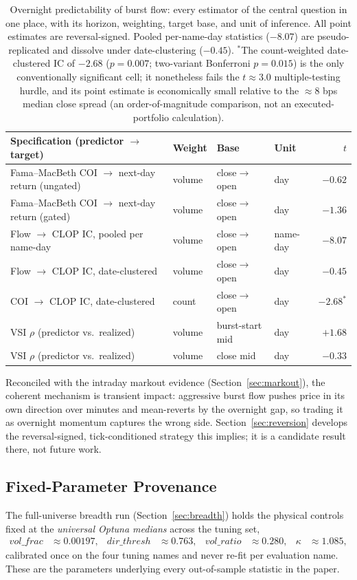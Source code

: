 \documentclass[11pt]{article}
\begin{document}
\begin{table}[htbp]
\centering
\begin{tabular}{llll r}
\toprule
\textbf{Specification (predictor $\to$ target)} & \textbf{Weight} & \textbf{Base} & \textbf{Unit} & \textbf{$t$} \\
\midrule
Fama--MacBeth COI $\to$ next-day return (ungated) & volume & close$\to$open & day & $-0.62$ \\
Fama--MacBeth COI $\to$ next-day return (gated) & volume & close$\to$open & day & $-1.36$ \\
Flow $\to$ CLOP IC, pooled per name-day & volume & close$\to$open & name-day & $-8.07$ \\
Flow $\to$ CLOP IC, date-clustered & volume & close$\to$open & day & $-0.45$ \\
COI $\to$ CLOP IC, date-clustered & count & close$\to$open & day & $-2.68^{*}$ \\
VSI $\rho$ (predictor vs.\ realized) & volume & burst-start mid & day & $+1.68$ \\
VSI $\rho$ (predictor vs.\ realized) & volume & close mid & day & $-0.33$ \\
\bottomrule
\end{tabular}
\caption{Overnight predictability of burst flow: every estimator of the central question in one place, with its horizon, weighting, target base, and unit of inference. All point estimates are reversal-signed. Pooled per-name-day statistics ($-8.07$) are pseudo-replicated and dissolve under date-clustering ($-0.45$). $^{*}$The count-weighted date-clustered IC of $-2.68$ ($p=0.007$; two-variant Bonferroni $p=0.015$) is the only conventionally significant cell; it nonetheless fails the \citet{harvey2016} $t\approx3.0$ multiple-testing hurdle, and its point estimate is economically small relative to the $\approx8$ bps median close spread (an order-of-magnitude comparison, not an executed-portfolio calculation).}
\label{tab:overnight}
\end{table}

Reconciled with the intraday markout evidence (Section~\ref{sec:markout}), the coherent mechanism is transient impact: aggressive burst flow pushes price in its own direction over minutes and mean-reverts by the overnight gap, so trading it as overnight momentum captures the wrong side. Section~\ref{sec:reversion} develops the reversal-signed, tick-conditioned strategy this implies; it is a candidate result there, not future work.

\subsection{Fixed-Parameter Provenance}
The full-universe breadth run (Section~\ref{sec:breadth}) holds the physical controls fixed at the \emph{universal Optuna medians} across the tuning set,
\begin{align}
vol\_frac &\approx 0.00197, & dir\_thresh &\approx 0.763, & vol\_ratio &\approx 0.280, & \kappa &\approx 1.085,
\end{align}
calibrated once on the four tuning names and never re-fit per evaluation name. These are the parameters underlying every out-of-sample statistic in the paper.
\end{document}
